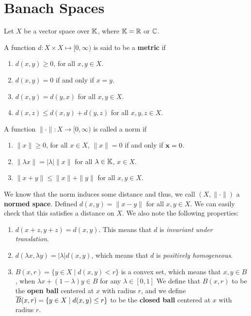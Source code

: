 \chapter{Banach Spaces}
Let $X$  be a vector space over $\mathbb{K}$, where $\mathbb{K} = {\mathbb R}$ or ${\mathbb C}$. 
\begin{definition}
A function $d: X \times X \mapsto [0, \infty)$ is said to be a \textbf{metric} if 
\begin{enumerate}
\item[(D1)] $d(x, y) \geq 0$, for all $x, y \in X$. 
\item[(D2)] $d(x, y) = 0$ if and only if $x = y$.
\item[(D3)] $d(x, y) = d(y, x)$ for all $x, y \in X$.
\item[(D4)] $d(x, z) \leq d(x, y) + d(y, z)$ for all $x, y, z \in X$. 
\end{enumerate}
\end{definition}
\begin{definition}
A function $\| \cdot \| : X \to [0, \infty)$ is called a norm if 
\begin{enumerate}
\item[(N1)] $\| x \| \geq 0$, for all $x \in X$, $\| x \| = 0$ if and only if $\mathbf{x} = 0$. 
\item[(N2)] $\| \lambda x \| = | \lambda | \| x \|$ for all $ \lambda \in \mathbb{K}$, $x \in X$. 
\item[(N3)] $\| x + y \| \leq \| x \| + \| y \|$ for all $x, y \in X$. 
\end{enumerate}
\end{definition}
We know that the norm induces some distance and thus, we call $(X, \| \cdot \|)$ a \textbf{normed space}. Defined $d(x, y) = \| x - y \|$ for all $x, y \in X$. We can easily check that this satisfies a distance on $X$. 
We also note the following properties: 
\begin{enumerate}
\item $d(x + z, y + z) = d(x, y)$. This means that $d$ is \textit{invariant under translation}.
\item $d(\lambda x, \lambda y) = |\lambda| d(x, y)$, which means that $d$ is \textit{positively homogeneous}. 
\item $B(x, r) = \{ y \in X \mid d(x, y) < r \}$ is a convex set, which means that $x, y \in B$, when $\lambda x + (1 - \lambda) y \in B$ for any $\lambda \in [0, 1]$ We define that $B(x,r)$ to be the \textbf{open ball} centered at $x$ with radius $r$, and we define $\overline{B}(x, r) = \{ y \in X \mid d(x, y) \leq r \}$ to be the \textbf{closed ball} centered at $x$ with radius $r$. 
\end{enumerate}
